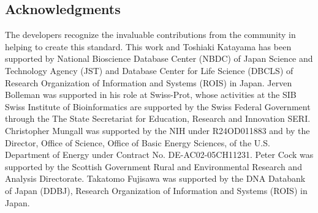 \documentclass[10pt]{bmc_article}
\newenvironment{bmcformat}{\begin{raggedright}\baselineskip20pt\sloppy\setboolean{publ}{false}}{\end{raggedright}\baselineskip20pt\sloppy}
\begin{document}
\begin{bmcformat}
\section*{Acknowledgments}
The developers recognize the invaluable contributions from the community in helping to create this standard.
This work and Toshiaki Katayama has been supported by National Bioscience Database Center (NBDC) of Japan Science and Technology Agency (JST) and Database Center for Life Science (DBCLS) of Research Organization of Information and Systems (ROIS) in Japan.
Jerven Bolleman was supported in his role at Swiss-Prot, whose activities at the SIB Swiss Institute of Bioinformatics are supported by the Swiss Federal Government through the The State Secretariat for Education, Research and Innovation SERI.
Christopher Mungall was supported by the NIH under R24OD011883 and by the Director, Office of Science, Office of Basic Energy Sciences, of the U.S. Department of Energy under Contract No. DE-AC02-05CH11231.
Peter Cock was supported by the Scottish Government Rural and Environmental Research and Analysis Directorate.
Takatomo Fujisawa was supported by the DNA Databank of Japan (DDBJ), Research Organization of Information and Systems (ROIS) in Japan.

\newpage
{
   }     %
  
\end{bmcformat}
\end{document}
